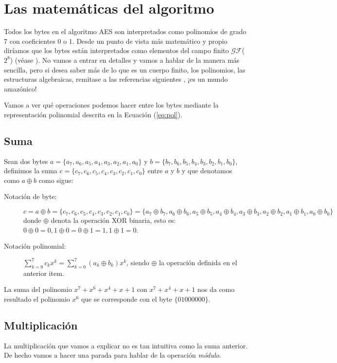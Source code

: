 \section{Las matemáticas del algoritmo}
Todos los bytes en el algoritmo AES son interpretados como polinomios de grado 7 con coeficientes $0$ o $1$. Desde un punto de vista más matemático y propio diríamos que los bytes están interpretados como elementos del campo finito $\mathcal{GF}$($2^8$) (véase \cite{Hart}). No vamos a entrar en detalles y vamos a hablar de la manera más sencilla, pero si desea saber más de lo que es un cuerpo finito, los polinomios, las estructuras algebraicas, remitase a las referencias siguientes \cite{Hart,Hilton,HUnger} , ¡es un mundo amazónico!

Vamos a ver qué operaciones podemos hacer entre los bytes mediante la representación polinomial descrita en la Ecuación (\ref{eq:pol}).
\subsection{Suma}\label{ss:suma}
Sean dos bytes $a=\{a_7,a_6,a_5,a_4,a_3,a_2,a_1,a_0\}$ y $b=\{b_7,b_6,b_5,b_4,b_3,b_2,b_1,b_0\}$, definimos la suma $c=\{c_7,c_6,c_5,c_4,c_3,c_2,c_1,c_0\}$ entre $a$ y $b$ y que denotamos como $a \oplus b$ como sigue:
\begin{description}
\item[Notación de byte:]
$c=a\oplus b=\{c_7,c_6,c_5,c_4,c_3,c_2,c_1,c_0\}=\{a_7 \oplus b_7,a_6 \oplus b_6,a_5 \oplus b_5,a_4 \oplus b_4,a_3 \oplus b_3,a_2 \oplus b_2,a_1\oplus b_1 ,a_0 \oplus b_0\}$ donde $\oplus$ denota la operación XOR binaria, esto es: $0 \oplus 0=0, 1 \oplus 0=0 \oplus 1=1, 1 \oplus 1=0 $.
\item[Notación polinomial:] $\sum_{k=0}^7 c_k x^k=\sum_{k=0}^7 (a_k \oplus b_k) x^k$, siendo $\oplus$ la operación definida en el anterior item.
\end{description}
\begin{example}
La suma del polinomio $x^7+x^6+x^4+x+1$ con $x^7+x^4+x+1$ nos da como resultado el polinomio $x^6$ que se corresponde con el byte $\{01000000\}$.
\end{example}

\subsection{Multiplicación}\label{ss:prod}
La multiplicación que vamos a explicar no es tan intuitiva como la suma anterior. De hecho vamos a hacer una parada para hablar de la operación {\sl módulo}.

